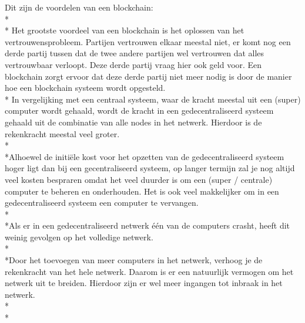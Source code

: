\documentclass[fleqn,a4paper,12pt]{book}
\begin{document}
Dit zijn de voordelen van een blockchain:\\*\\*
Het grootste voordeel van een blockchain is het oplossen van het vertrouwensprobleem. Partijen vertrouwen elkaar meestal niet, er komt nog een derde partij tussen dat de twee andere partijen wel vertrouwen dat alles vertrouwbaar verloopt. Deze derde partij vraag hier ook geld voor. Een blockchain zorgt ervoor dat deze derde partij niet meer nodig is door de manier hoe een blockchain systeem wordt opgesteld.\\*
In vergelijking met een centraal systeem, waar de kracht meestal uit een (super) computer wordt gehaald, wordt de kracht in een gedecentraliseerd systeem gehaald uit de combinatie van alle nodes in het netwerk. Hierdoor is de rekenkracht meestal veel groter.\\*\\*Alhoewel de initiële kost voor het opzetten van de gedecentraliseerd systeem hoger ligt dan bij een gecentraliseerd systeem, op langer termijn zal je nog altijd veel kosten bespraren omdat het veel duurder is om een (super / centrale) computer te beheren en onderhouden. Het is ook veel makkelijker om in een gedecentraliseerd systeem een computer te vervangen.\\*\\*Als er in een gedecentraliseerd netwerk één van de computers crasht, heeft dit weinig gevolgen op het volledige netwerk.\\*\\*Door het toevoegen van meer computers in het netwerk, verhoog je de rekenkracht van het hele netwerk. Daarom is er een natuurlijk vermogen om het netwerk uit te breiden. Hierdoor zijn er wel meer ingangen tot inbraak in het netwerk.\\*\\*
\end{document}
